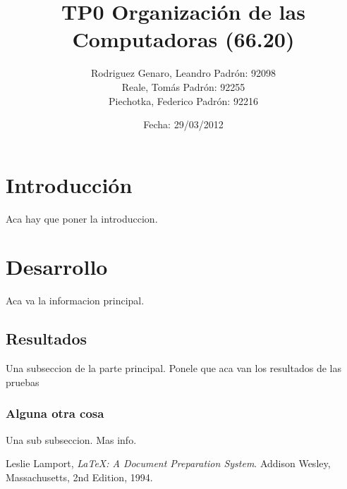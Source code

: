 \documentclass[a4paper,10pt]{report}
\begin{document}
\title{TP0 Organización de las Computadoras (66.20)}
\author{
  Rodriguez Genaro, Leandro	Padrón: 92098\\
  Reale, Tomás			Padrón: 92255\\
  Piechotka, Federico		Padrón: 92216}
\date{Fecha: 29/03/2012}

\maketitle

\section{Introducción}
Aca hay que poner la introduccion.


\section{Desarrollo}
Aca va la informacion principal.

\subsection{Resultados}
Una subseccion de la parte principal. Ponele que aca van los resultados de las pruebas

\subsubsection{Alguna otra cosa}
Una sub subseccion. Mas info.


\begin{thebibliography}{9}

	  Leslie Lamport,
	  \emph{\LaTeX: A Document Preparation System}.
	  Addison Wesley, Massachusetts,
	  2nd Edition,
	  1994.

\end{thebibliography}
\end{document}
